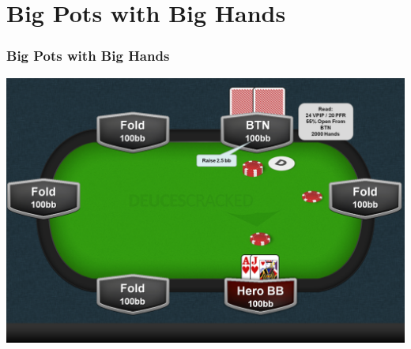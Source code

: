 \documentclass{beamer}
\begin{document}
\section{Big Pots with Big Hands}
\begin{frame}
\frametitle{Big Pots with Big Hands}
\includegraphics[keepaspectratio=true,width=.75\paperwidth]{Value.png}
\end{frame}
\end{document}
